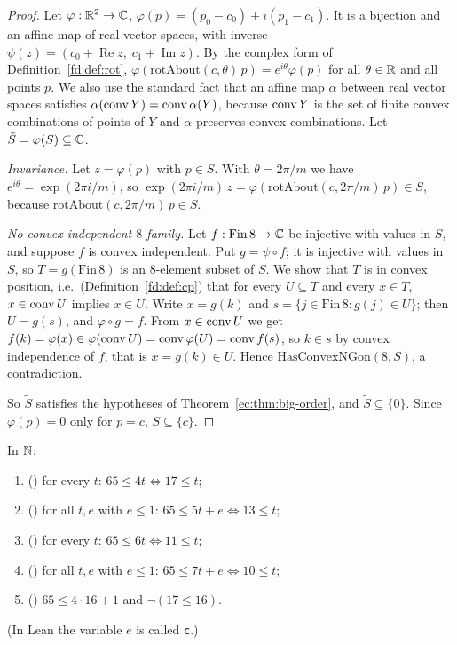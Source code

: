 \begin{proof}
Let $\varphi:\mathbb R^2\to\mathbb C$, $\varphi(p)=(p_0-c_0)+i(p_1-c_1)$. It is a bijection and an affine map of real vector spaces,
with inverse $\psi(z)=(c_0+\operatorname{Re}z,\;c_1+\operatorname{Im}z)$. By the complex form of
Definition~\ref{fd:def:rot}, $\varphi(\mathrm{rotAbout}(c,\theta)\,p)=e^{i\theta}\varphi(p)$ for all $\theta\in\mathbb R$ and
all points $p$. We also use the standard fact that an affine map $\alpha$ between real vector spaces satisfies
$\alpha(\operatorname{conv} Y)=\operatorname{conv}\alpha(Y)$, because $\operatorname{conv} Y$ is the set of finite convex combinations of points of $Y$ and
$\alpha$ preserves convex combinations. Let $\tilde S=\varphi(S)\subseteq\mathbb C$.

\emph{Invariance.} Let $z=\varphi(p)$ with $p\in S$. With $\theta=2\pi/m$ we have $e^{i\theta}=\exp(2\pi i/m)$, so
$\exp(2\pi i/m)\,z=\varphi(\mathrm{rotAbout}(c,2\pi/m)\,p)\in\tilde S$, because $\mathrm{rotAbout}(c,2\pi/m)\,p\in S$.

\emph{No convex independent $8$-family.} Let $f:\mathrm{Fin}\,8\to\mathbb C$ be injective with values in $\tilde S$, and
suppose $f$ is convex independent. Put $g=\psi\circ f$; it is injective with values in $S$, so $T=g(\mathrm{Fin}\,8)$
is an $8$-element subset of $S$. We show that $T$ is in convex position, i.e.\ (Definition~\ref{fd:def:cp}) that for
every $U\subseteq T$ and every $x\in T$, $x\in\operatorname{conv} U$ implies $x\in U$. Write $x=g(k)$ and
$s=\{j\in\mathrm{Fin}\,8: g(j)\in U\}$; then $U=g(s)$, and $\varphi\circ g=f$. From $x\in\operatorname{conv} U$ we get
$f(k)=\varphi(x)\in\varphi(\operatorname{conv} U)=\operatorname{conv}\varphi(U)=\operatorname{conv} f(s)$, so $k\in s$ by convex independence of $f$, that is
$x=g(k)\in U$. Hence $\mathrm{HasConvexNGon}(8,S)$, a contradiction.

So $\tilde S$ satisfies the hypotheses of Theorem~\ref{ec:thm:big-order}, and $\tilde S\subseteq\{0\}$. Since
$\varphi(p)=0$ only for $p=c$, $S\subseteq\{c\}$.
\end{proof}

\begin{proposition}\label{ec:prop:thr}
In $\mathbb N$:
\begin{enumerate}[label=(\roman*)]
\item \textup{()} for every $t$: $65\le4t\iff17\le t$;
\item \textup{()} for all $t,e$ with $e\le1$: $65\le5t+e\iff13\le t$;
\item \textup{()} for every $t$: $65\le6t\iff11\le t$;
\item \textup{()} for all $t,e$ with $e\le1$: $65\le7t+e\iff10\le t$;
\item \textup{()} $65\le4\cdot16+1$ and $\neg(17\le16)$.
\end{enumerate}
\textup{(}In Lean the variable $e$ is called \texttt{c}.\textup{)}
\end{proposition}

